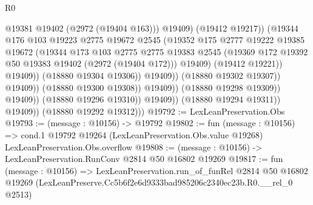 \begin{lexlean}{R0}
\begin{coremodule}
                                                    @19381
                                                    @19402
                                                    (@2972 (@19404 @163)))
                                                  @19409)
                                                (@19412 @19217))
                                              (@19344
                                                @176
                                                @103
                                                @19223
                                                @2775
                                                @19672
                                                @2545
                                                (@19352
                                                  @175
                                                  @2777
                                                  @19222
                                                  @19385
                                                  @19672
                                                  (@19344
                                                    @173
                                                    @103
                                                    @2775
                                                    @2775
                                                    @19383
                                                    @2545
                                                    (@19369
                                                      @172
                                                      @19392
                                                      @50
                                                      @19383
                                                      @19402
                                                      (@2972 (@19404 @172)))
                                                    @19409)
                                                  (@19412 @19221))
                                                @19409))
                                            (@18880 @19304 @19306))
                                          @19409))
                                      (@18880 @19302 @19307))
                                    @19409))
                                (@18880 @19300 @19308))
                              @19409))
                          (@18880 @19298 @19309))
                        @19409))
                    (@18880 @19296 @19310))
                  @19409))
              (@18880 @19294 @19311))
            @19409))
        (@18880 @19292 @19312)))
@19792 := LexLeanPreservation.Obs
@19793 := (message : @10156) -> @19792
@19802 := fun (message : @10156) =>
  cond.{1} @19792 @19264 (LexLeanPreservation.Obs.value @19268) LexLeanPreservation.Obs.overflow
@19808 := (message : @10156) -> LexLeanPreservation.RunConv @2814 @50 @16802 @19269
@19817 := fun (message : @10156) =>
  LexLeanPreservation.run_of_funRel
    @2814
    @50
    @16802
    @19269
    (LexLeanPreserve.Cc5b6f2e6d9333bad985206c2340ec23b.R0.__rel_0 @2513)
\end{coremodule}
\end{lexlean}
